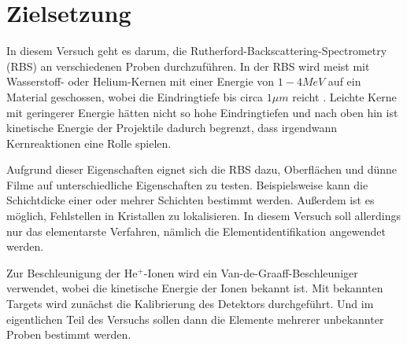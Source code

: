 \section{Zielsetzung}
In diesem Versuch geht es darum, die Rutherford-Backscattering-Spectrometry (RBS) an verschiedenen Proben durchzuführen. In der RBS wird meist mit Wasserstoff- oder Helium-Kernen mit einer Energie von $1-4MeV$ auf ein Material geschossen, wobei die Eindringtiefe bis circa $1\mu m$ reicht \cite{anleitung}. Leichte Kerne mit geringerer Energie hätten nicht so hohe Eindringtiefen und nach oben hin ist kinetische Energie der Projektile dadurch begrenzt, dass irgendwann Kernreaktionen eine Rolle spielen.

Aufgrund dieser Eigenschaften eignet sich die RBS dazu, Oberflächen und dünne Filme auf unterschiedliche Eigenschaften zu testen. Beispielsweise kann die Schichtdicke einer oder mehrer Schichten bestimmt werden. Außerdem ist es möglich, Fehlstellen in Kristallen zu lokalisieren. In diesem Versuch soll allerdings nur das elementarste Verfahren, nämlich die Elementidentifikation angewendet werden. 

Zur Beschleunigung der He$^+$-Ionen wird ein Van-de-Graaff-Beschleuniger verwendet, wobei die kinetische Energie der Ionen bekannt ist. Mit bekannten Targets wird zunächst die Kalibrierung des Detektors durchgeführt. Und im eigentlichen Teil des Versuchs sollen dann die Elemente mehrerer unbekannter Proben bestimmt werden.
